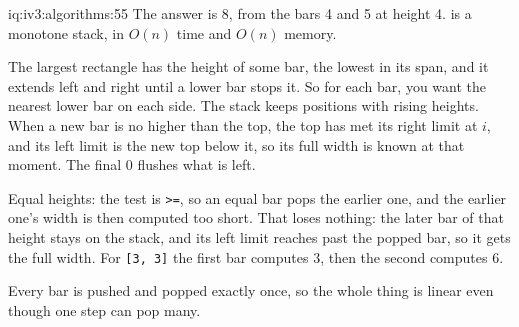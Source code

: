 \begin{solution}{iq:iv3:algorithms:55}
The answer is 8, from the bars 4 and 5 at height 4.  is a monotone stack, in $O(n)$ time and $O(n)$ memory.
\enlargethispage{-3\baselineskip}%
\label{lst:iv3:al:histogram}

The largest rectangle has the height of some bar, the lowest in its span, and it extends left and right until a lower bar stops it. So for each bar, you want the nearest lower bar on each side. The stack keeps positions with rising heights. When a new bar is no higher than the top, the top has met its right limit at $i$, and its left limit is the new top below it, so its full width is known at that moment. The final 0 flushes what is left.

Equal heights: the test is \texttt{>=}, so an equal bar pops the earlier one, and the earlier one's width is then computed too short. That loses nothing: the later bar of that height stays on the stack, and its left limit reaches past the popped bar, so it gets the full width. For \texttt{[3, 3]} the first bar computes 3, then the second computes 6.

Every bar is pushed and popped exactly once, so the whole thing is linear even though one step can pop many.

\end{solution}

